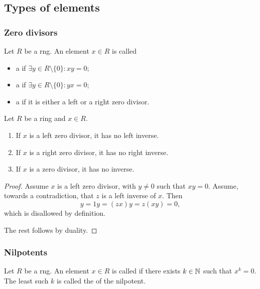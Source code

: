 \subsection{Types of elements}
\subsubsection{Zero divisors}
\begin{definition}
Let $R$ be a rng. An element $x\in R$ is called
\begin{itemize}
\item a  if $\exists y \in R\setminus\{0\}: xy = 0$;
\item a  if $\exists y \in R\setminus\{0\}: yx = 0$;
\item a  if it is either a left or a right zero divisor.
\end{itemize}
\end{definition}

\begin{lemma} \label{inverseZeroDivisor}
Let $R$ be a ring and $x\in R$.
\begin{enumerate}
\item If $x$ is a left zero divisor, it has no left inverse.
\item If $x$ is a right zero divisor, it has no right inverse.
\item If $x$ is a zero divisor, it has no inverse.
\end{enumerate}
\end{lemma}
\begin{proof}
Assume $x$ is a left zero divisor, with $y\neq 0$ such that $xy = 0$. Assume, towards a contradiction, that $z$ is a left inverse of $x$. Then
\[ y = 1y = (zx)y = z(xy) = 0, \]
which is disallowed by definition.

The rest follows by duality.
\end{proof}

\subsubsection{Nilpotents}
\begin{definition}
Let $R$ be a rng. An element $x\in R$ is called  if there exists $k\in \mathbb{N}$ such that $x^k = 0$. The least such $k$ is called the  of the nilpotent.
\end{definition}

